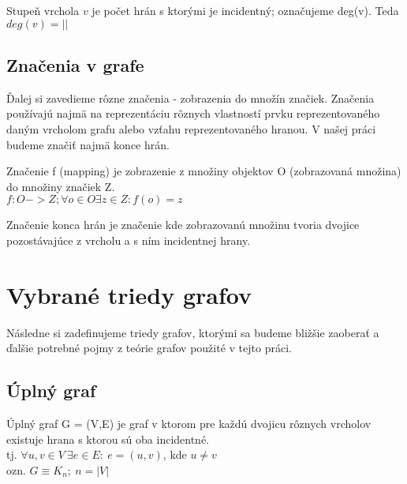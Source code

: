 \begin{defin}
Stupeň vrchola $v$ je počet hrán s ktorými je incidentný; označujeme deg(v).
Teda $deg(v) = ||$
\end{defin}
%  




\subsection{Značenia v grafe}
Ďalej si zavedieme rôzne značenia - zobrazenia do množín značiek. Značenia používajú najmä na reprezentáciu rôznych vlastností prvku reprezentovaného daným vrcholom grafu alebo vzťahu reprezentovaného hranou. V našej práci budeme značiť najmä konce hrán.\\

\begin{defin}
Značenie f (mapping) je zobrazenie z množiny objektov O (zobrazovaná množina) do množiny značiek Z.\\
$f: O -> Z ; \forall o \in O  \exists z \in Z  : f(o)=z$
\end{defin}

\begin{defin}
Značenie konca hrán je značenie kde zobrazovanú množinu tvoria dvojice pozostávajúce z vrcholu a s ním incidentnej hrany.
\end{defin}

\section{Vybrané triedy grafov}
Následne si zadefinujeme triedy grafov, ktorými sa budeme bližšie zaoberať a ďalšie potrebné pojmy z teórie grafov použité v tejto práci. 

\subsection{Úplný graf}
\begin{defin}
Úplný graf G = (V,E) je graf v ktorom pre každú dvojicu rôznych vrcholov existuje hrana s ktorou sú oba incidentné.\\
tj. $\forall u,v \in V\ \exists e \in  E :\ e=(u,v)$, kde $u \neq v$\\
ozn. $G \equiv K_n;\ n=|V|$
\end{defin}
